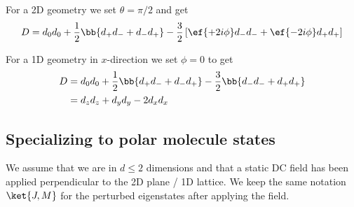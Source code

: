 For a 2D geometry we set $\theta=\pi/2$ and get
\begin{align*}
D = d_0 d_0 + \frac{1}{2}\bb{d_+ d_- + d_- d_+} -\frac{3}{2} \left[ \ef{+2i\phi} d_- d_- + \ef{-2i\phi} d_+ d_+\right]
\end{align*}

For a 1D geometry in $x$-direction we set $\phi=0$ to get
\begin{align*}
D &= d_0 d_0 + \frac{1}{2}\bb{d_+ d_- + d_- d_+} -\frac{3}{2} \bb{ d_- d_- + d_+ d_+}\\
 &= d_z d_z + d_y d_y - 2 d_x d_x
\end{align*}

\subsection{Specializing to polar molecule states}
We assume that we are in $d\le 2$ dimensions and that a static DC field has been applied perpendicular to the 2D plane / 1D lattice. We keep the same notation $\ket{J,M}$ for the perturbed eigenstates after applying the field.
